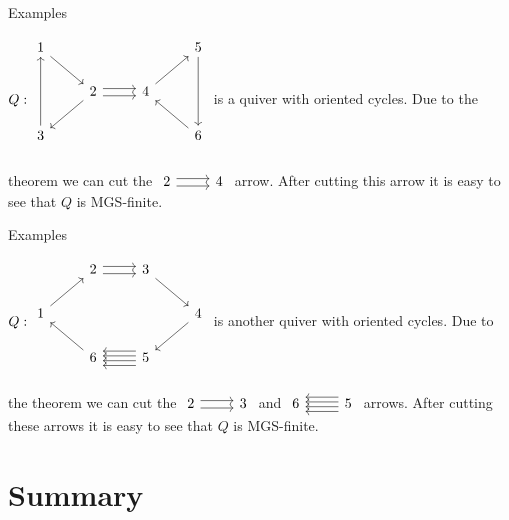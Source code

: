 \documentclass{beamer}
\newcommand{\rightdoublearrow}{\arrow[r, shift right=0.6ex]\arrow[r, shift left=0.6ex]}
\newcommand{\leftquadruplearrow}{\arrow[l, shift right=1.2ex]\arrow[l, shift left=0.4ex]\arrow[l, shift right=0.4ex]\arrow[l, shift left=1.2ex]}
\begin{document}
\begin{frame}[fragile]{Examples}
\begin{example}
$Q:\begin{tikzcd}
1\arrow[rd] &                                             &                   &5\arrow[dd]\\
                 &2\arrow[dl]\rightdoublearrow & 4\arrow[ur] &\\
3\arrow[uu] &                                            &                  &6\arrow[ul]\\
\end{tikzcd}$ is a quiver with oriented cycles. Due to the theorem we can cut the $\begin{tikzcd}2\rightdoublearrow & 4\end{tikzcd}$ arrow. After cutting this arrow it is easy to see that $Q$ is MGS-finite.
\end{example}
\end{frame}

\begin{frame}[fragile]{Examples}
\begin{example}
$Q:\begin{tikzcd}
 &       2\rightdoublearrow                                      &  3\arrow[rd]&\\
1\arrow[ru]                 &    &  &4\arrow[dl]\\
 &     6\arrow[ul]                                       & 5\leftquadruplearrow                 &\\
\end{tikzcd}$ is another quiver with oriented cycles.  Due to the theorem we can cut the $\begin{tikzcd}2\rightdoublearrow & 3\end{tikzcd}$ and  $\begin{tikzcd}6 & 5\leftquadruplearrow\end{tikzcd}$ arrows. After cutting these arrows it is easy to see that $Q$ is MGS-finite.
\end{example}

\end{frame}
\section*{Summary}
\end{document}
